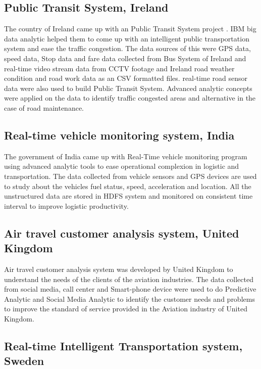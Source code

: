 \documentclass[sigconf]{acmart}
\begin{document}
\subsection{Public Transit System, Ireland}

The country of Ireland came up with an Public Transit System project \cite{bdlt}. IBM big data analytic helped them to come up with an intelligent public transportation system and ease the traffic congestion. The data sources of this were GPS data, speed data, Stop data and fare data collected from Bus System of Ireland and real-time video stream data from CCTV footage and  Ireland road weather condition and road work data as an CSV formatted files. real-time road sensor data were also used to build Public Transit System. Advanced analytic concepts were applied on the data to identify traffic congested areas and alternative in the case of road maintenance. 

\subsection{Real-time vehicle monitoring system, India}

The government of India came up with Real-Time vehicle monitoring program \cite{bdlt} using advanced analytic tools to ease operational complexion in logistic and transportation. The data collected from vehicle sensors and GPS devices are used to study about the vehicles fuel status, speed, acceleration and location. All the unstructured data are stored in HDFS system and monitored on consistent time interval to improve logistic productivity.

\subsection{Air travel customer analysis system, United Kingdom}

Air travel customer analysis system \cite{bdlt} was developed by United Kingdom to understand the needs of the clients of the aviation industries. The data collected from social media, call center and Smart-phone device were used to do Predictive Analytic and Social Media Analytic to identify the customer needs and problems to improve the standard of service provided in the Aviation industry of United Kingdom.

\subsection{Real-time Intelligent Transportation system, Sweden}
\end{document}

